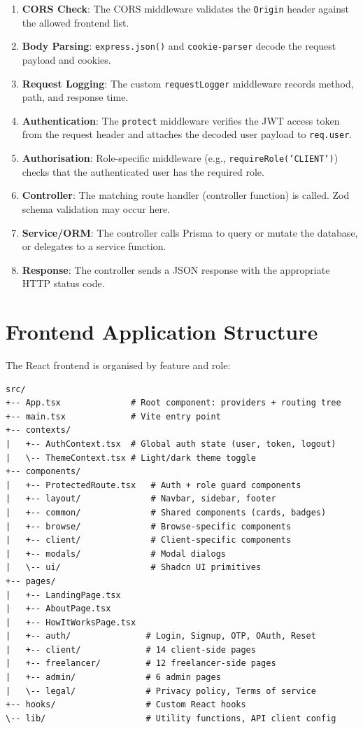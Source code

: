 \begin{enumerate}
  \item \textbf{CORS Check}: The CORS middleware validates the \texttt{Origin} header against the allowed frontend list.
  \item \textbf{Body Parsing}: \texttt{express.json()} and \texttt{cookie-parser} decode the request payload and cookies.
  \item \textbf{Request Logging}: The custom \texttt{requestLogger} middleware records method, path, and response time.
  \item \textbf{Authentication}: The \texttt{protect} middleware verifies the JWT access token from the request header and attaches the decoded user payload to \texttt{req.user}.
  \item \textbf{Authorisation}: Role-specific middleware (e.g., \texttt{requireRole('CLIENT')}) checks that the authenticated user has the required role.
  \item \textbf{Controller}: The matching route handler (controller function) is called. Zod schema validation may occur here.
  \item \textbf{Service/ORM}: The controller calls Prisma to query or mutate the database, or delegates to a service function.
  \item \textbf{Response}: The controller sends a JSON response with the appropriate HTTP status code.
\end{enumerate}

\section{Frontend Application Structure}

The React frontend is organised by feature and role:

\begin{lstlisting}[caption={Frontend Directory Structure}]
src/
+-- App.tsx              # Root component: providers + routing tree
+-- main.tsx             # Vite entry point
+-- contexts/
|   +-- AuthContext.tsx  # Global auth state (user, token, logout)
|   \-- ThemeContext.tsx # Light/dark theme toggle
+-- components/
|   +-- ProtectedRoute.tsx   # Auth + role guard components
|   +-- layout/              # Navbar, sidebar, footer
|   +-- common/              # Shared components (cards, badges)
|   +-- browse/              # Browse-specific components
|   +-- client/              # Client-specific components
|   +-- modals/              # Modal dialogs
|   \-- ui/                  # Shadcn UI primitives
+-- pages/
|   +-- LandingPage.tsx
|   +-- AboutPage.tsx
|   +-- HowItWorksPage.tsx
|   +-- auth/               # Login, Signup, OTP, OAuth, Reset
|   +-- client/             # 14 client-side pages
|   +-- freelancer/         # 12 freelancer-side pages
|   +-- admin/              # 6 admin pages
|   \-- legal/              # Privacy policy, Terms of service
+-- hooks/                  # Custom React hooks
\-- lib/                    # Utility functions, API client config
\end{lstlisting}

